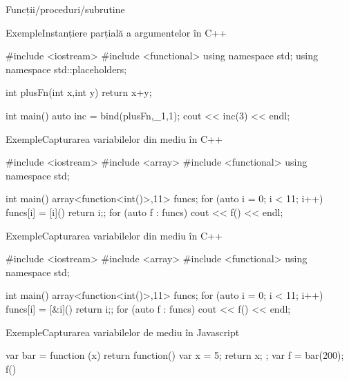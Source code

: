 \documentclass[xcolor=pdftex,romanian,colorlinks]{beamer}
\begin{document}
\begin{section}{Funcții/proceduri/subrutine}
\begin{frame}[fragile]{Exemple}{Instanțiere parțială a argumentelor în C++}
\begin{asciic}
#include <iostream>
#include <functional>
using namespace std;
using namespace std::placeholders;

int plusFn(int x,int y) {return x+y;}

int main()
{
    auto inc = bind(plusFn,_1,1);
    cout << inc(3) << endl;
}
\end{asciic}
\end{frame}


\begin{frame}[fragile]{Exemple}{Capturarea variabilelor din mediu în C++}
\begin{asciic}
#include <iostream>
#include <array>
#include <functional>
using namespace std;

int main() {
    array<function<int()>,11> funcs;
    for (auto i = 0; i < 11; i++) {
    	funcs[i] = [i]() {return i;};
    }
    for (auto f : funcs) {
    	cout << f() << endl;
    }
}
\end{asciic}
\end{frame}

\begin{frame}[fragile]{Exemple}{Capturarea variabilelor din mediu în C++}
\begin{asciic}
#include <iostream>
#include <array>
#include <functional>
using namespace std;

int main() {
    array<function<int()>,11> funcs;
    for (auto i = 0; i < 11; i++) {
    	funcs[i] = [&i]() {return i;};
    }
    for (auto f : funcs) {
    	cout << f() << endl;
    }
}
\end{asciic}
\end{frame}



\begin{frame}[fragile]{Exemple}{Capturarea variabilelor de mediu în Javascript}
\begin{asciijs}
var bar = function (x) { 
  return function() { var x = 5; return x; }; 
}
var f = bar(200);
f()
\end{asciijs}
\end{frame}
\end{section}
\end{document}
